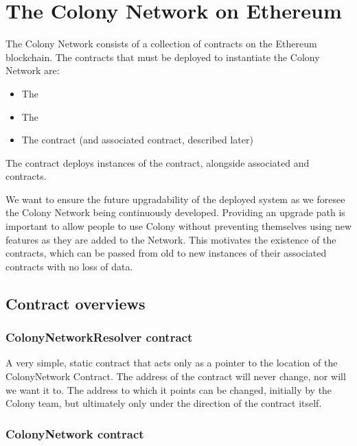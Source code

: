 \section{The Colony Network on Ethereum}\label{sec:colonynetwork}

The Colony Network consists of a collection of contracts on the Ethereum blockchain. The contracts that must be deployed to instantiate the Colony Network are:

\begin{itemize}
\item The 
\item The 
\item The  contract (and associated  contract, described later)
\end{itemize}

The  contract deploys instances of the  contract, alongside associated  and  contracts.

We want to ensure the future upgradability of the deployed system as we foresee the Colony Network being continuously developed. Providing an upgrade path is important to allow people to use Colony without preventing themselves using new features as they are added to the Network. This motivates the existence of the  contracts, which can be passed from old to new instances of their associated contracts with no loss of data.

\subsection{Contract overviews}

\subsubsection{ColonyNetworkResolver contract}
A very simple, static contract that acts only as a pointer to the location of the ColonyNetwork Contract. The address of the  contract will never change, nor will we want it to. The address to which it points can be changed, initially by the Colony team, but ultimately only under the direction of the  contract itself.

\subsubsection {ColonyNetwork contract}

